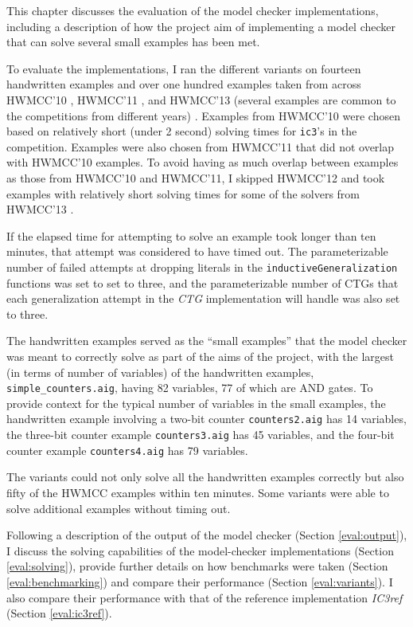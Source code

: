 \documentclass[12pt,a4paper,twoside,openright]{report}
\begin{document}
{This chapter discusses the evaluation of the model checker implementations,
including a description of how the project aim of implementing a model checker
that can solve several small examples has been met.

To evaluate the implementations, I ran the different variants
on fourteen handwritten examples and over one hundred examples taken from
across HWMCC'10 \cite{hwmcc10}, HWMCC'11 \cite{hwmcc11}, and HWMCC'13
(several examples are common to the competitions from different years) \cite{hwmcc13}.
Examples from HWMCC'10 were chosen based on relatively short (under 2 second)
solving times for \verb,ic3,'s in the competition.
Examples were also chosen from HWMCC'11 that did not overlap with HWMCC'10 examples.
To avoid having as much overlap between examples as those from HWMCC'10 and HWMCC'11,
I skipped HWMCC'12 and took examples
with relatively short solving times for some of the solvers from HWMCC'13
\cite{hwmcc13}.

If the elapsed time for attempting to solve an example took longer than ten minutes, that
attempt was considered to have timed out. The parameterizable number of failed attempts
at dropping literals in the \verb,inductiveGeneralization, functions was set to set to
three, and the parameterizable number of CTGs that each generalization attempt
in the {\it CTG} implementation will handle was also set to three.

The handwritten examples served as the ``small examples'' that the model checker
was meant to correctly solve as part of the aims of the project, with the largest
(in terms of number of variables) of the handwritten examples,
\verb,simple_counters.aig,, having 82 variables, 77 of which are AND gates.
To provide context for the
typical number of variables in the small examples, the handwritten example involving a
two-bit counter \verb,counters2.aig, has 14 variables, the three-bit counter example
\verb,counters3.aig, has 45 variables, and the four-bit counter example
\verb,counters4.aig, has 79 variables.

The variants could not only solve all the handwritten examples correctly
but also fifty of the HWMCC examples within ten minutes. Some
variants were able to solve additional examples without timing out.

Following a description of the output of the model checker (Section \ref{eval:output}),
I discuss the solving capabilities of the model-checker implementations (Section
\ref{eval:solving}), provide further details on how benchmarks were taken
(Section \ref{eval:benchmarking}) and compare
their performance (Section \ref{eval:variants}).
I also compare their performance with that of the reference implementation
\emph{IC3ref} (Section \ref{eval:ic3ref}).

}
\end{document}
